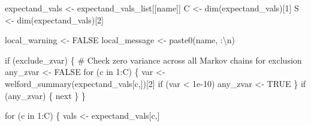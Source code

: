 \documentclass[
  letterpaper,
  DIV=11,
  numbers=noendperiod]{scrartcl}
\newenvironment{Shaded}{\begin{snugshade}}{\end{snugshade}}
\newcommand{\BuiltInTok}[1]{\textcolor[rgb]{0.00,0.23,0.31}{#1}}
\newcommand{\CharTok}[1]{\textcolor[rgb]{0.13,0.47,0.30}{#1}}
\newcommand{\CommentTok}[1]{\textcolor[rgb]{0.37,0.37,0.37}{#1}}
\newcommand{\ControlFlowTok}[1]{\textcolor[rgb]{0.00,0.23,0.31}{#1}}
\newcommand{\DecValTok}[1]{\textcolor[rgb]{0.68,0.00,0.00}{#1}}
\newcommand{\FloatTok}[1]{\textcolor[rgb]{0.68,0.00,0.00}{#1}}
\newcommand{\KeywordTok}[1]{\textcolor[rgb]{0.00,0.23,0.31}{#1}}
\newcommand{\NormalTok}[1]{\textcolor[rgb]{0.00,0.23,0.31}{#1}}
\newcommand{\OperatorTok}[1]{\textcolor[rgb]{0.37,0.37,0.37}{#1}}
\newcommand{\StringTok}[1]{\textcolor[rgb]{0.13,0.47,0.30}{#1}}
\begin{document}
\begin{Shaded}
\begin{Highlighting}[]
\NormalTok{    expectand\_vals }\OperatorTok{\textless{}{-}}\NormalTok{ expectand\_vals\_list[[name]]}
\NormalTok{    C }\OperatorTok{\textless{}{-}}\NormalTok{ dim(expectand\_vals)[}\DecValTok{1}\NormalTok{]}
\NormalTok{    S }\OperatorTok{\textless{}{-}}\NormalTok{ dim(expectand\_vals)[}\DecValTok{2}\NormalTok{]}
    
\NormalTok{    local\_warning }\OperatorTok{\textless{}{-}}\NormalTok{ FALSE}
\NormalTok{    local\_message }\OperatorTok{\textless{}{-}}\NormalTok{ paste0(name, }\StringTok{\textquotesingle{}:}\CharTok{\textbackslash{}n}\StringTok{\textquotesingle{}}\NormalTok{)}
  
    \ControlFlowTok{if}\NormalTok{ (exclude\_zvar) \{}
      \CommentTok{\# Check zero variance across all Markov chains for exclusion}
\NormalTok{      any\_zvar }\OperatorTok{\textless{}{-}}\NormalTok{ FALSE}
      \ControlFlowTok{for}\NormalTok{ (c }\KeywordTok{in} \DecValTok{1}\NormalTok{:C) \{}
\NormalTok{        var }\OperatorTok{\textless{}{-}}\NormalTok{ welford\_summary(expectand\_vals[c,])[}\DecValTok{2}\NormalTok{]}
        \ControlFlowTok{if}\NormalTok{ (var }\OperatorTok{\textless{}} \FloatTok{1e{-}10}\NormalTok{)}
\NormalTok{          any\_zvar }\OperatorTok{\textless{}{-}}\NormalTok{ TRUE}
\NormalTok{      \}}
      \ControlFlowTok{if}\NormalTok{ (any\_zvar) \{}
        \BuiltInTok{next}
\NormalTok{      \}}
\NormalTok{    \}}
  
    \ControlFlowTok{for}\NormalTok{ (c }\KeywordTok{in} \DecValTok{1}\NormalTok{:C) \{}
\NormalTok{      vals }\OperatorTok{\textless{}{-}}\NormalTok{ expectand\_vals[c,]}
      

\end{Highlighting}
\end{Shaded}
\end{document}
